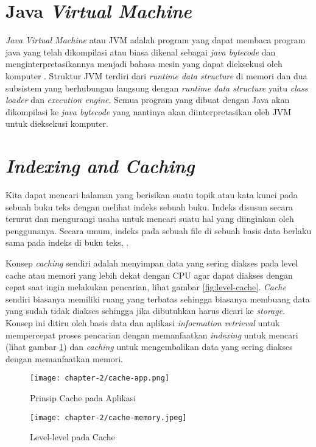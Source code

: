 \section{Java \textit{Virtual Machine}}
\textit{Java Virtual Machine} atau JVM adalah program yang dapat membaca program java yang telah dikompilasi atau biasa dikenal sebagai \textit{java bytecode} dan menginterpretasikannya menjadi bahasa mesin yang dapat dieksekusi oleh komputer \parencite{java12}. Struktur JVM terdiri dari \textit{runtime data structure} di memori dan dua subsistem yang berhubungan langsung dengan \textit{runtime data structure} yaitu \textit{class loader} dan \textit{execution engine}. Semua program yang dibuat dengan Java akan dikompilasi ke \textit{java bytecode} yang nantinya akan diinterpretasikan oleh JVM untuk dieksekusi komputer. 

\section{\textit{Indexing and Caching}}
Kita dapat mencari halaman yang berisikan suatu topik atau kata kunci pada sebuah buku teks dengan melihat indeks sebuah buku. Indeks disusun secara terurut dan mengurangi usaha untuk mencari suatu hal yang diinginkan oleh penggunanya. Secara umum, indeks pada sebuah file di sebuah basis data berlaku sama pada indeks di buku teks, \parencite{database}.

Konsep \textit{caching} sendiri adalah menyimpan data yang sering diakses pada level cache atau memori yang lebih dekat dengan CPU agar dapat diakses dengan cepat saat ingin melakukan pencarian, lihat gambar \ref{fig:level-cache}. \textit{Cache} sendiri biasanya memiliki ruang yang terbatas sehingga biasanya membuang data yang sudah tidak diakses sehingga jika dibutuhkan harus dicari ke \textit{storage}. Konsep ini ditiru oleh basis data dan aplikasi \textit{information retrieval} untuk mempercepat proses pencarian dengan memanfaatkan \textit{indexing} untuk mencari (lihat gambar \ref{fig:cache-app}) dan \textit{caching} untuk mengembalikan data yang sering diakses dengan memanfaatkan memori.

\begin{figure}[h]
    \centering
    \texttt{[image: chapter-2/cache-app.png]}
    \caption{Prinsip Cache pada Aplikasi}
    \label{fig:cache-app}
\end{figure}

\begin{figure}[h]
    \centering
    \texttt{[image: chapter-2/cache-memory.jpeg]}
    \caption{Level-level pada Cache}
    \label{fig:cache-level}
\end{figure}

